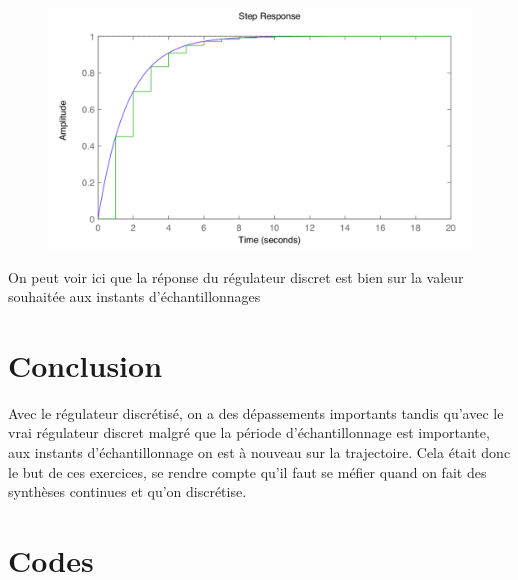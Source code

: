 \begin{figure}[!h]
\center\includegraphics[width=1\linewidth]{images/graph2_4.png}
\label{labo2-4}
\end{figure}

On peut voir ici que la réponse du régulateur discret est bien sur la valeur souhaitée aux instants d'échantillonnages 

\section{Conclusion}

Avec le régulateur discrétisé, on a des dépassements importants tandis qu'avec le vrai régulateur discret malgré que la période d'échantillonnage est importante, aux instants d'échantillonnage on est à nouveau sur la trajectoire.
Cela était donc le but de ces exercices, se rendre compte qu'il faut se méfier quand on fait des synthèses continues et qu'on discrétise.


\section{Codes}
